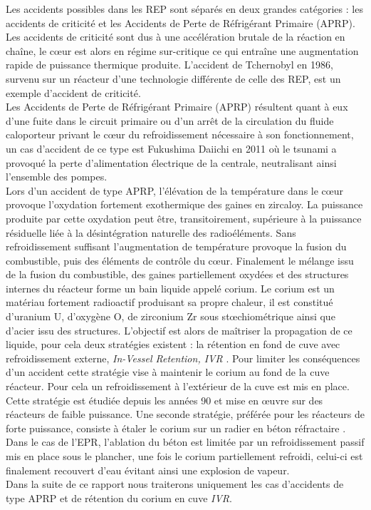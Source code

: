 Les accidents possibles dans les REP sont séparés en deux grandes catégories : les accidents de criticité et les Accidents de Perte de Réfrigérant Primaire (APRP). Les accidents de criticité sont dus à une accélération brutale de la réaction en chaîne, le c\oe ur est alors en régime sur-critique ce qui entraîne une augmentation rapide de puissance thermique produite. L'accident de Tchernobyl en 1986, survenu sur un réacteur d'une technologie différente de celle des REP, est un exemple d'accident de criticité.\\ Les Accidents de Perte de Réfrigérant Primaire (APRP) résultent quant à eux d'une fuite dans le circuit primaire ou d'un arrêt de la circulation du fluide caloporteur privant le c\oe ur du refroidissement nécessaire à son fonctionnement, un cas d'accident de ce type est Fukushima Daiichi en 2011 où le tsunami a provoqué la perte d'alimentation électrique de la centrale, neutralisant ainsi l'ensemble des pompes. \\
Lors d'un accident de type APRP, l'élévation de la température dans le c\oe ur provoque l'oxydation fortement exothermique des gaines en zircaloy. La puissance produite par cette oxydation peut être, transitoirement,  supérieure à la puissance résiduelle liée à la désintégration naturelle des radioéléments. Sans refroidissement suffisant l'augmentation de température provoque la fusion du combustible, puis des éléments de contrôle du c\oe ur. Finalement le mélange issu de la fusion du combustible, des gaines partiellement oxydées et des structures internes du réacteur forme un bain liquide appelé corium. Le corium est un matériau fortement radioactif produisant sa propre chaleur, il est constitué d'uranium U, d'oxygène O, de zirconium Zr sous st\oe chiométrique ainsi que d'acier issu des structures.  L'objectif est alors de maîtriser la propagation de ce liquide, pour cela deux stratégies existent : la rétention en fond de cuve avec refroidissement externe, \textit{In-Vessel Retention, IVR} \cites{shi_cap1400_2019}{seiler_etudes_2010}. Pour limiter les conséquences d'un accident cette stratégie vise à maintenir le corium au fond de la cuve réacteur. Pour cela un refroidissement à l'extérieur de la cuve est mis en place. Cette stratégie est étudiée depuis les années 90 et mise en \oe uvre sur des réacteurs de faible puissance.
Une seconde stratégie, préférée pour les réacteurs de forte puissance, consiste à étaler le corium sur un radier en béton réfractaire \cite{bouteille_epr_2006}. Dans le cas de l'EPR, l'ablation du béton est limitée par un refroidissement passif mis en place sous le plancher, une fois le corium partiellement refroidi, celui-ci est finalement recouvert d'eau évitant ainsi une explosion de vapeur.\\
Dans la suite de ce rapport nous traiterons uniquement les cas d'accidents de type APRP et de rétention du corium en cuve \textit{IVR}.
